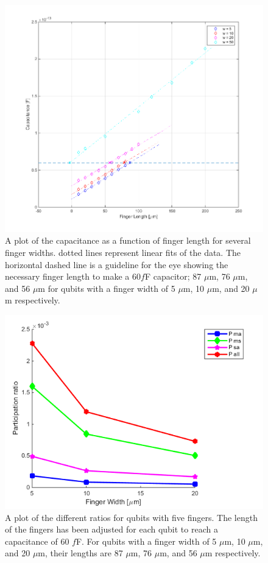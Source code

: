 \begin{figure}
	\centering
	\includegraphics[width = \textwidth]{Figures/Capacitances_g5_50}
	\caption{A plot of the capacitance as a function of finger length for several finger widths. dotted lines represent linear fits of the data. The horizontal dashed line is a guideline for the eye showing the necessary finger length to make a 60\(f\)F capacitor; 87 \(\mu\)m, 76 \(\mu\)m, and 56 \(\mu\)m for qubits with a finger width of  5 \(\mu\)m, 10 \(\mu\)m, and 20 \(\mu\)m respectively.}
	\label{fig:Capacitances_g5_50}
\end{figure} 

\clearpage

 \begin{figure}
 	\centering
 	\includegraphics[scale = 0.7]{Figures/Ratio_plots/FingerWidth_legend}
 	\caption{A plot of the different ratios for qubits with five fingers.  The length of the fingers has been adjusted for each qubit to reach a capacitance of 60 \(f\)F. For qubits with a finger width of  5 \(\mu\)m, 10 \(\mu\)m, and 20 \(\mu\)m, their lengths are 87 \(\mu\)m, 76 \(\mu\)m, and 56 \(\mu\)m  respectively.}
 	\label{fig:FingerWidth_legend}
 \end{figure}

